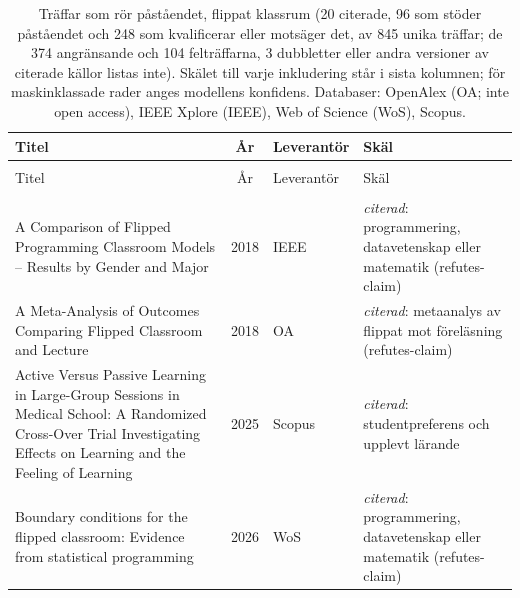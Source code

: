 
\begingroup\footnotesize
\begin{longtable}{@{}%
  >{\raggedright\arraybackslash}p{}c%
  >{\raggedright\arraybackslash}p{}%
  >{\raggedright\arraybackslash}p{}@{}}
\caption{Träffar som rör påståendet, flippat klassrum (20 citerade, 96 som stöder påståendet och 248 som kvalificerar eller motsäger det, av 845 unika träffar; de 374 angränsande och 104 felträffarna, 3 dubbletter eller andra versioner av citerade källor listas inte). Skälet till varje inkludering står i sista kolumnen; för maskinklassade rader anges modellens konfidens. Databaser: OpenAlex (OA; inte open access), IEEE Xplore (IEEE), Web of Science (WoS), Scopus.}\label{tab:sok-recap-flippat}\\
\toprule
Titel & År & Leverantör & Skäl \\
\midrule
\endfirsthead
\multicolumn{4}{@{}l}{\emph{\tablename~\thetable{} (forts.)}}\\
\toprule
Titel & År & Leverantör & Skäl \\
\midrule
\endhead
\midrule \multicolumn{4}{r@{}}{\emph{forts.\ på nästa sida}}\\
\endfoot
\bottomrule
\endlastfoot
A Comparison of Flipped Programming Classroom Models -- Results by Gender and Major & 2018 & IEEE & \emph{citerad}: programmering, datavetenskap eller matematik (refutes-claim) \\
A Meta-Analysis of Outcomes Comparing Flipped Classroom and Lecture & 2018 & OA & \emph{citerad}: metaanalys av flippat mot föreläsning (refutes-claim) \\
Active Versus Passive Learning in Large-Group Sessions in Medical School: A Randomized Cross-Over Trial Investigating Effects on Learning and the Feeling of Learning & 2025 & Scopus & \emph{citerad}: studentpreferens och upplevt lärande \\
Boundary conditions for the flipped classroom: Evidence from statistical programming & 2026 & WoS & \emph{citerad}: programmering, datavetenskap eller matematik (refutes-claim) \\

\end{longtable}
